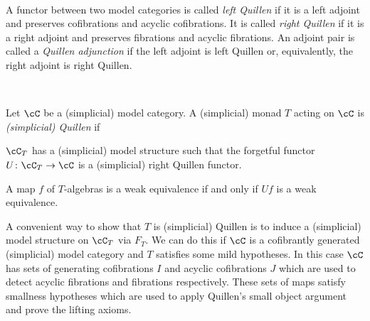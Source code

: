 \documentclass[leqno,oneside,english]{elsarticle}
\newcounter{enumisaved}
\newlength{\thmsaved}
\newlength{\thmnow}
\begin{document}
{{    {}  \ifshowcomplete
  \ 
  {
\begin{defn*}
  A functor between two model categories is called \emph{left Quillen}
  if it is a left adjoint and preserves cofibrations and acyclic
  cofibrations. It is called \emph{right Quillen} if it is a right
  adjoint and preserves fibrations and acyclic fibrations. An adjoint
  pair is called a \emph{Quillen adjunction} if the left
  adjoint is left Quillen or, equivalently, the right adjoint is right Quillen.
\end{defn*}

}
  {}
  \ 
  \ifthenelse{\lengthtest{\thmnow > \thmsaved}}{
    
    \setcounter{thm}{{\strip@pt{\thmsaved}}}  
  }{
    
  }
  \setcounter{enumi}{\theenumisaved}
    \else  \fi
}}{}
\begin{defn}\label{def:quillen}
  Let $\cC$ be a (simplicial) model category.
  A (simplicial) monad $T$ acting on $\cC$ is \emph{(simplicial) Quillen} if 
  \begin{hypothenumerate}
  \item $\cC_T$ has a (simplicial) model structure such that the
    forgetful functor $U\colon \cC_T\rightarrow \cC$ is a (simplicial)
    right Quillen functor.
  \item A map $f$ of $T$-algebras is a weak equivalence if and only if
    $Uf$ is a weak equivalence.
  \end{hypothenumerate}
\end{defn}

A convenient way to show that $T$ is (simplicial) Quillen is to
induce a (simplicial)
model structure on $\cC_T$ via $F_T$. We can do this if $\cC$ is a
cofibrantly generated (simplicial) model category and $T$ satisfies some mild hypotheses.  In this
case $\cC$ has sets of generating cofibrations $I$ and acyclic
cofibrations $J$ which are used to detect acyclic fibrations and 
fibrations respectively. These sets of maps satisfy smallness hypotheses which are
used to apply Quillen's small object argument and prove the lifting
axioms.
\end{document}
